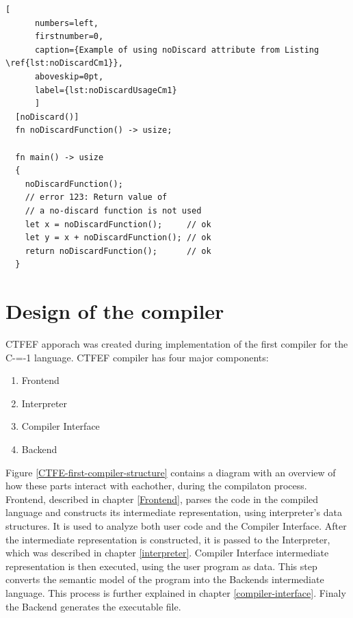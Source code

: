 \begin{minipage}{\linewidth}

	\begin{lstlisting}[
	  numbers=left,
	  firstnumber=0,
	  caption={Example of using noDiscard attribute from Listing \ref{lst:noDiscardCm1}},
	  aboveskip=0pt,
	  label={lst:noDiscardUsageCm1}
	  ]
  [noDiscard()]
  fn noDiscardFunction() -> usize;

  fn main() -> usize
  {
	noDiscardFunction();
	// error 123: Return value of
	// a no-discard function is not used
	let x = noDiscardFunction();     // ok
	let y = x + noDiscardFunction(); // ok
	return noDiscardFunction();      // ok
  }
  \end{lstlisting}
\end{minipage}

\section{Design of the compiler}
\label{compiler-design}

CTFEF apporach was created during implementation of the first compiler for the C-=-1 language\cite{grabski2022compilation}.
CTFEF compiler has four major components: 
\begin{enumerate}
	\item Frontend
	\item Interpreter
	\item Compiler Interface
	\item Backend
\end{enumerate}

Figure \ref{CTFE-first-compiler-structure} contains a diagram with an overview of how these parts interact with eachother, during the compilaton process.
Frontend, described in chapter \ref{Frontend}, parses the code in the compiled language and constructs its intermediate representation, using interpreter's data structures.
It is used to analyze both user code and the Compiler Interface.
After the intermediate representation is constructed, it is passed to the Interpreter, which was described in chapter \ref{interpreter}.
Compiler Interface intermediate representation is then executed, using the user program as data.
This step converts the semantic model of the program into the Backends intermediate language.
This process is further explained in chapter \ref{compiler-interface}.
Finaly the Backend generates the executable file.


